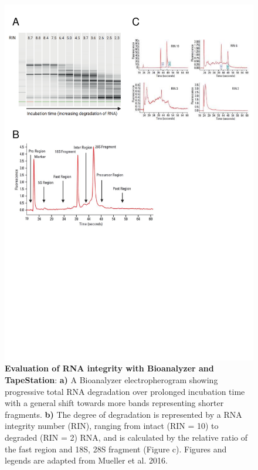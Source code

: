 \begin{figure}[htp]
	\centering
	\vspace{20pt}
	\includegraphics[page=1,trim={0 10cm 0 0 },clip, scale = 0.7]{Figures/General_Methodology_Figures.pdf}
	\captionsetup{width=0.95\textwidth}
	\caption[Evaluation of RNA integrity with Bioanalyzer and TapeStation]%
	{\textbf{Evaluation of RNA integrity with Bioanalyzer and TapeStation}: \textbf{a)} A Bioanalyzer electropherogram showing progressive total RNA degradation over prolonged incubation time with a general shift towards more bands representing shorter fragments. \textbf{b)} The degree of degradation is represented by a RNA integrity number (RIN), ranging from intact (RIN = 10) to degraded (RIN = 2) RNA, and is calculated by the relative ratio of the fast region and 18S, 28S fragment (Figure c). Figures and legends are adapted from Mueller et al. 2016.}
	\label{fig:bionalayzer_pics}
\end{figure}

